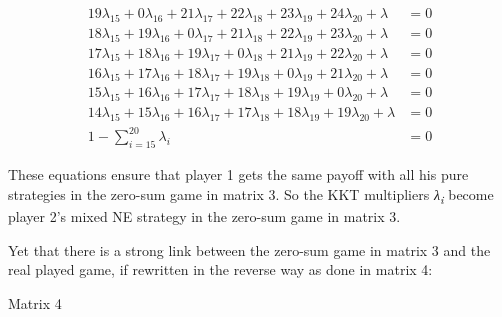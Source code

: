 \begin{Article}
\begin{refsection}[Umbhauer]
\newpage

\begin{align*}
19\lambda_{15} + 0\lambda_{16} + 21\lambda_{17} + 22\lambda_{18} + 23\lambda_{19} + 24\lambda_{20} + \lambda &= 0 \\
18\lambda_{15} + 19\lambda_{16} + 0\lambda_{17} + 21\lambda_{18} + 22\lambda_{19} + 23\lambda_{20} + \lambda &= 0 \\
17\lambda_{15} + 18\lambda_{16} + 19\lambda_{17} + 0\lambda_{18} + 21\lambda_{19} + 22\lambda_{20} + \lambda &= 0 \\ \tag{3}
16\lambda_{15} + 17\lambda_{16} + 18\lambda_{17} + 19\lambda_{18} + 0\lambda_{19} + 21\lambda_{20} + \lambda &= 0 \\
15\lambda_{15} + 16\lambda_{16} + 17\lambda_{17} + 18\lambda_{18} + 19\lambda_{19} + 0\lambda_{20} + \lambda &= 0 \\
14\lambda_{15} + 15\lambda_{16} + 16\lambda_{17} + 17\lambda_{18} + 18\lambda_{19} + 19\lambda_{20} + \lambda &= 0 \\
1 - \sum_{i = 15}^{20}{\lambda_{i}} &= 0
\end{align*}

These equations ensure that player 1 gets the same payoff with all his
pure strategies in the zero-sum game in matrix 3. So the KKT multipliers
\emph{λ\textsubscript{i}} become player 2's mixed NE strategy in the
zero-sum game in matrix 3.

Yet that there is a strong link between the zero-sum game in matrix 3
and the real played game, if rewritten in the reverse way as done in
matrix 4:

\begin{table}[h!]
\centering
Matrix 4\par
\vspace{0.2cm}
\label{matx3}
\end{table}


\end{refsection}
\end{Article}
